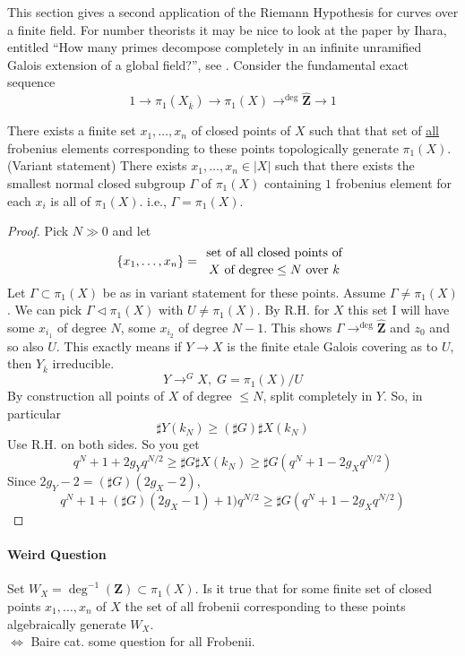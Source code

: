 \noindent
This section gives a second application of the Riemann Hypothesis for
curves over a finite field. For number theorists it may be nice
to look at the paper by Ihara, entitled
``How many primes decompose completely in an infinite unramified Galois
extension of a global field?'', see \cite{Ihara}.
Consider the fundamental exact sequence
$$1\to \pi_1(X_{\overline k})\to
\pi_1(X)\to^{\deg}\widehat{\mathbf{Z}}\to 1$$
\begin{proposition}
There exists a finite set $x_1, \ldots, x_n$ of closed points of $X$
such that that set of \underline{all} frobenius elements corresponding to these
points topologically generate $\pi_1(X)$. \\

\noindent
(Variant statement) There exists $x_1, \ldots, x_n\in |X|$ such that
there exists the smallest normal closed subgroup $\Gamma$ of $\pi_1(X)$
containing $1$ frobenius element for each $x_i$ is all of $\pi_1(X)$. i.e.,
$\Gamma=\pi_1(X)$.
\end{proposition}
\begin{proof} Pick $N\gg 0$ and let
$$\left\{x_1, \ldots, x_n\right\}={\text{ set of all closed points of
}\atop X\text{ of degree} \leq N\text{ over } k}$$
Let $\Gamma\subset \pi_1(X)$ be as in variant statement for these
points. Assume $\Gamma\neq \pi_1(X)$. We can pick $\Gamma\lhd \pi_1(X)$ with
$U\neq \pi_1(X)$. By R.H. for $X$ this set I will have some $x_{i_1}$ of degree
$N$, some $x_{i_2}$ of degree $N-1$. This shows
$\Gamma\to^{\deg}\widehat{\mathbf{Z}}$ and $z_0$ and so also $U$. This exactly
means if $Y\to X$ is the finite etale Galois covering as to $U$, then
$Y_{\overline k}$ irreducible.
$$Y\to^G X, \; G = \pi_1(X)/U$$
By construction all points of $X$ of degree $\leq N$, split
completely in $Y$. So, in particular
$$\sharp Y(k_N)\geq (\sharp G)\sharp X(k_N)$$
Use R.H. on both sides. So you get
$$q^N+1+2g_Yq^{N/2}\geq \sharp G\sharp X(k_N)\geq \sharp
G(q^N+1-2g_Xq^{N/2})$$
Since $2g_Y-2 = (\sharp G)(2g_X-2)$,
$$q^N+1+(\sharp G)(2g_X-1)+1)q^{N/2}\geq \sharp
G(q^N+1-2g_Xq^{N/2})$$
\end{proof}	

\paragraph{Weird Question} Set $W_X = \deg^{-1}(\mathbf{Z})\subset \pi_1(X)$.
Is it true that for some finite set of closed points $x_1, \ldots, x_n$ of $X$
the set of all frobenii corresponding to these points algebraically generate
$W_X$. \\
$\iff$ Baire cat. some question for all Frobenii.


